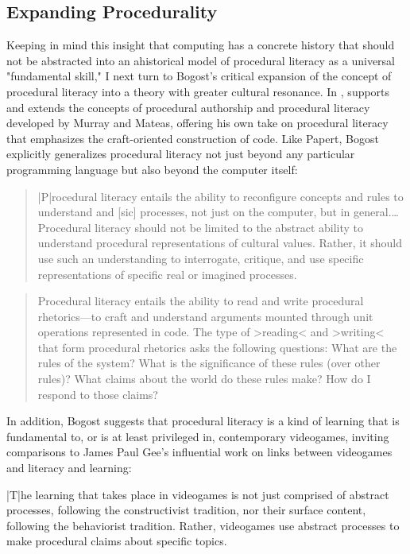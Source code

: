 \subsection*{Expanding Procedurality}
Keeping in mind this insight that computing has a concrete history that should not be abstracted into an ahistorical model of procedural literacy as a universal "fundamental skill," I next turn to Bogost's critical expansion of the concept of procedural literacy into a theory with greater cultural resonance. In , \citeauthor{Bogost2007-ow} supports and extends the concepts of procedural authorship and procedural literacy developed by Murray and Mateas, offering his own take on procedural literacy that emphasizes the craft-oriented construction of code. Like Papert, Bogost explicitly generalizes procedural literacy not just beyond any particular programming language but also beyond the computer itself:

\blockcquote[245--6]{Bogost2007-ow}{
  |P|rocedural literacy entails the ability to reconfigure concepts and rules to understand and [sic] processes, not just on the computer, but in general.…Procedural literacy should not be limited to the abstract ability to understand procedural representations of cultural values. Rather, it should use such an understanding to interrogate, critique, and use specific representations of specific real or imagined processes.}
\blockcquote[258]{Bogost2007-ow}{
  Procedural literacy entails the ability to read and write procedural rhetorics---to craft and understand arguments mounted through unit operations represented in code. The type of >reading< and >writing< that form procedural rhetorics asks the following questions: What are the rules of the system? What is the significance of these rules (over other rules)? What claims about the world do these rules make? How do I respond to those claims?
}
In addition, Bogost suggests that procedural literacy is a kind of learning that is fundamental to, or is at least privileged in, contemporary videogames, inviting comparisons to James Paul Gee's influential work on links between videogames and literacy and learning:

\begin{quoting}
  |T|he learning that takes place in videogames is not just comprised of abstract processes, following the constructivist tradition, nor their surface content, following the behaviorist tradition. Rather, videogames use abstract processes to make procedural claims about specific topics. \autocite[245]{Bogost2007-ow}
\end{quoting}

